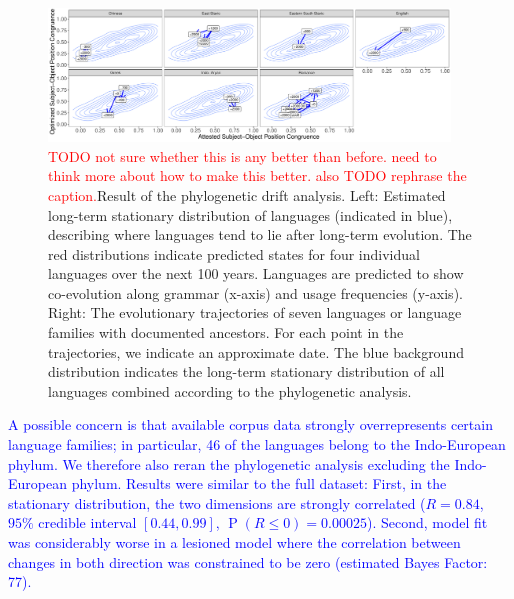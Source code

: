 \documentclass[9pt,twocolumn,twoside,lineno]{pnas-new}
\begin{document}
\begin{figure}
    \includegraphics[width=0.95\textwidth]{../analysis/figures/historical_2.6_times_stationary_layout_new.pdf}
	\caption{ \textcolor{red}{TODO not sure whether this is any better than before. need to think more about how to make this better. also TODO rephrase the caption.}Result of the phylogenetic drift analysis.
	Left: Estimated long-term stationary distribution of languages (indicated in blue), describing where languages tend to lie after long-term evolution.
    The red distributions indicate predicted states for four individual languages over the next 100 years. Languages are predicted to show co-evolution along grammar (x-axis)  and usage frequencies (y-axis).	    
Right: The evolutionary trajectories of seven languages or language families with documented ancestors. For each point in the trajectories, we indicate an approximate date. The blue background distribution indicates the long-term stationary distribution of all languages combined according to the phylogenetic analysis. }
    \label{fig:historical}\label{fig:drift-model}
\end{figure}


\textcolor{blue}{A possible concern is that available corpus data strongly overrepresents certain language families; in particular, 46 of the languages belong to the Indo-European phylum.
We therefore also reran the phylogenetic analysis excluding the Indo-European phylum.
Results were similar to the full dataset:
First, in the stationary distribution, the two dimensions are strongly correlated ($R=0.84$, $95\%$ credible interval $[0.44, 0.99]$, $\operatorname{P}(R\leq 0) = 0.00025$). %
Second, model fit was considerably worse in a lesioned model where the correlation between changes in both direction was constrained to be zero (estimated Bayes Factor: 77).} 
\end{document}
